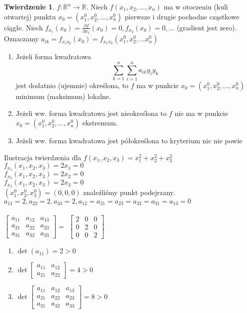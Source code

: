 \documentclass{article}
\theoremstyle{definition}
\theoremstyle{definition}
\newtheorem{tw}{Twierdzenie}[subsection]
\theoremstyle{definition}
\theoremstyle{definition}
\theoremstyle{definition}
\theoremstyle{definition}
\theoremstyle{definition}
\begin{document}
\begin{tw}
    $f: \mathbb{R}^n \rightarrow \mathbb{R}$. Niech $f(x_1, x_2, \dots, x_n)$ ma w otoczeniu (kuli otwartej) punktu $x_0=(x_1^0,x_2^0,\dots,x_n^0)$ 
    pierwsze i drugie pochodne cząstkowe ciągłe. Niech $f_{x_1}(x_0)=\frac{\partial f}{\partial x_1}(x_0)=0, f_{x_2}(x_0)=0, \dots$ (gradient jest zero).
    Oznaczamy $a_{ik} = f_{x_i x_k} (x_0) = f_{x_1 x_k} (x_1^0, x_2^0,\dots x_n^0)$
    \begin{enumerate}
        \item Jeżeli forma kwadratowa \[\sum_{k=1}^{n} \sum_{i=1}^{n} a_{ik} y_{i} y_{k}\]
        jest dodatnio (ujemnie) określona, to $f$ ma w punkcie $x_0=(x_1^0,x_2^0,\dots,x_n^0)$ minimum (maksimum) lokalne.
        \item Jeżeli ww. forma kwadratowa jest nieokreślona to $f$ nie ma w punkcie $x_0=(x_1^0,x_2^0,\dots,x_n^0)$ ekstremum.
        \item Jeżeli ww. forma kwadratowa jest półokreślona to kryterium nic nie powie
    \end{enumerate}
\end{tw}
Ilustracja twierdzenia dla
$f(x_1,x_2,x_3)=x_1^2+x_2^2+x_3^2$\\
$f_{x_1} (x_1,x_2,x_3) = 2x_1 =0$\\
$f_{x_2} (x_1,x_2,x_3) = 2x_2 =0$\\
$f_{x_3} (x_1,x_2,x_3) = 2x_3 =0$\\
$(x_1^0, x_2^0, x_3^0) = (0,0,0)$ znaleźliśmy punkt podejrzany.\\
$a_{11}=2, a_{22}=2, a_{33}=2, a_{12}=a_{21}=a_{23}=a_{32}=a_{31}=a_{13}=0$\\\\
$ \begin{bmatrix}
a_{11} & a_{12} & a_{13} \\
a_{21} & a_{22} & a_{23} \\
a_{31} & a_{32} & a_{33} 
\end{bmatrix} = $
$ \begin{bmatrix}
2 & 0 & 0 \\
0 & 2 & 0 \\
0 & 0 & 2
\end{bmatrix} $\\
\begin{enumerate}
    \item $\det\left(a_{11}\right) = 2 > 0$
    \item $\det\begin{bmatrix}
    a_{11} & a_{12} \\
    a_{21} & a_{22} 
    \end{bmatrix} = 4 > 0$
    \item $\det\begin{bmatrix}
        a_{11} & a_{12} & a_{13} \\
        a_{21} & a_{22} & a_{23} \\
        a_{31} & a_{32} & a_{33} 
        \end{bmatrix}=8>0$
\end{enumerate}
\end{document}
